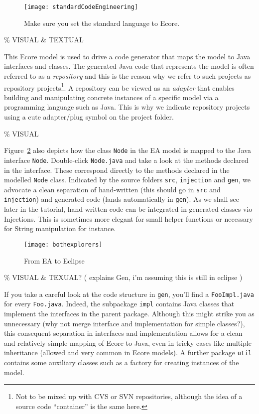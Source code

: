 \begin{figure}[htbp]
  \centering
  \texttt{[image: standardCodeEngineering]}
  \caption{Make sure you set the standard language to Ecore.}
  \label{fig_standardSCEEA}
\end{figure}

\% VISUAL \& TEXTUAL

This Ecore model is used to drive a code generator that maps the model to Java interfaces and classes.  
The generated Java code that represents the model is often referred to as a \emph{repository} and this is the reason why we refer to such projects as repository projects\footnote{Not to be mixed up with CVS or SVN repositories, although the idea of a source code ``container'' is the same here.}. 
A repository can be viewed as an \emph{adapter} that enables building and manipulating concrete instances of a specific model via a programming language such as Java.  
This is why we indicate repository projects using a cute adapter/plug symbol on the project folder.  

\% VISUAL

Figure~\ref{fig_fromEAtoEclipse} also depicts how the class \texttt{Node} in the EA model is mapped to the Java interface \texttt{Node}.  
Double-click \texttt{Node.java} and take a look at the methods declared in the interface.
These correspond directly to the methods declared in the modelled \texttt{Node} class.  
Indicated by the source folders \texttt{src}, \texttt{injection} and \texttt{gen}, we advocate a clean separation of hand-written (this should go in \texttt{src} and \texttt{injection}) and generated code (lands automatically in \texttt{gen}).  
As we shall see later in the tutorial, hand-written code can be integrated in generated classes vio Injections. 
This is sometimes more elegant for small helper functions or necessary for String manipulation for instance.

\begin{figure}[htbp]
    \centering
  \texttt{[image: bothexplorers]}
    \caption{From EA to Eclipse}
    \label{fig_fromEAtoEclipse}
\end{figure}

\% VISUAL \& TEXUAL? ({ \small explains Gen, i'm assuming this is still in eclipse })

If you take a careful look at the code structure in \texttt{gen}, you'll find a \texttt{Foo\-Impl.java} for every \texttt{Foo.java}. 
Indeed, the subpackage \texttt{impl} contains Java classes that implement the interfaces in the parent package.  
Although this might strike you as unnecessary (why not merge interface and implementation for simple classes?), this consequent separation in interfaces and implementation allows for a clean and relatively simple mapping of Ecore to Java, even in tricky cases like multiple inheritance (allowed and very common in Ecore models).  
A further package \texttt{util} contains some auxiliary classes such as a factory for creating instances of the model.  

